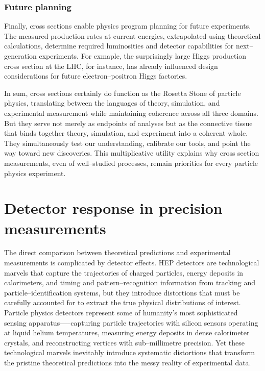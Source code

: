             \subsubsection{Future planning}
                Finally, cross sections enable physics program planning for future experiments.
                The measured production rates at current energies, extrapolated using theoretical calculations, determine required luminosities and detector capabilities for next--generation experiments.
                For exmaple, the surprisingly large Higgs production cross section at the LHC, for instance, has already influenced design considerations for future electron--positron Higgs factories.
                
    In sum, cross sections certainly do function as the Rosetta Stone of particle physics, translating between the languages of theory, simulation, and experimental measurement while maintaining coherence across all three domains.
    But they serve not merely as endpoints of analyses but as the connective tissue that binds together theory, simulation, and experiment into a coherent whole.
    They simultaneously test our understanding, calibrate our tools, and point the way toward new discoveries.
    This multiplicative utility explains why cross section measurements, even of well--studied processes, remain priorities for every particle physics experiment.

\section{Detector response in precision measurements}
    The direct comparison between theoretical predictions and experimental measurements is complicated by detector effects.
    HEP detectors are technological marvels that capture the trajectories of charged particles, energy deposits in calorimeters, and timing and pattern--recognition information from tracking and particle--identification systems, but they introduce distortions that must be carefully accounted for to extract the true physical distributions of interest.
    Particle physics detectors represent some of humanity's most sophisticated sensing apparatus—--capturing particle trajectories with silicon sensors operating at liquid helium temperatures, measuring energy deposits in dense calorimeter crystals, and reconstructing vertices with sub--millimetre precision.
    Yet these technological marvels inevitably introduce systematic distortions that transform the pristine theoretical predictions into the messy reality of experimental data.
    
